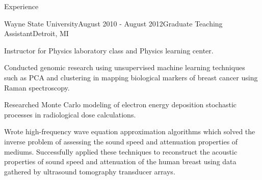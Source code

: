 \documentclass{resume} %
\begin{document}
\begin{rSection}{Experience}

\begin{rSubsection}{Wayne State University}{August 2010 - August 2012}{Graduate Teaching Assistant}{Detroit, MI}
\item Instructor for Physics laboratory class and Physics learning center. 
\item Conducted genomic research using unsupervised machine learning techniques such as PCA and clustering in mapping biological markers of breast cancer using Raman spectroscopy.
\item Researched Monte Carlo modeling of electron energy deposition stochastic processes in radiological dose calculations.
\item Wrote high-frequency wave equation approximation algorithms which solved the inverse problem of assessing the sound speed and attenuation properties of mediums. Successfully applied these techniques to reconstruct the acoustic properties of sound speed and attenuation of the human breast using data gathered by ultrasound tomography transducer arrays.
\end{rSubsection}

\end{rSection}
\end{document}
